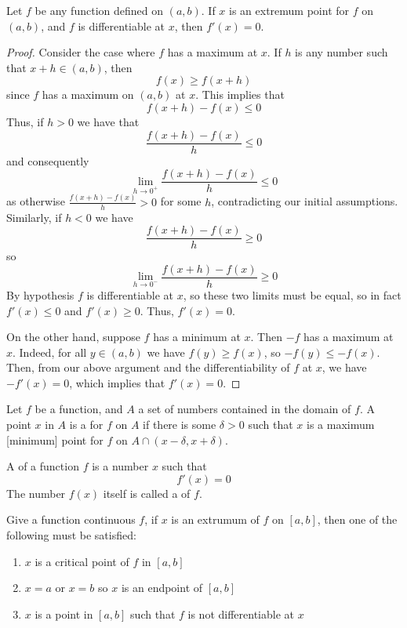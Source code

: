 \documentclass[12pt, a4paper, oneside, openright, titlepage]{book}
\begin{document}
\begin{thm}\label{thm:dirext}
    Let $f$ be any function defined on $(a,b)$. If $x$ is an extremum point for $f$ on $(a,b)$, and $f$ is differentiable at $x$, then $f'(x) = 0$.
\end{thm}
\begin{proof}
    Consider the case where $f$ has a maximum at $x$. If $h$ is any number such that $x+h \in (a,b)$, then $$f(x) \geq f(x+h)$$
    since $f$ has a maximum on $(a,b)$ at $x$. This implies that $$f(x+h)-f(x) \leq 0$$
    Thus, if $h > 0$ we have that $$\frac{f(x+h) - f(x)}{h} \leq 0$$
    and consequently $$\lim\limits_{h\rightarrow 0^+}\frac{f(x+h)-f(x)}{h} \leq 0$$
    as otherwise $\frac{f(x+h) - f(x)}{h} > 0$ for some $h$, contradicting our initial assumptions. Similarly, if $h < 0$ we have $$\frac{f(x+h)-f(x)}{h} \geq 0$$
    so $$\lim\limits_{h\rightarrow 0^-}\frac{f(x+h)-f(x)}{h} \geq 0$$
    By hypothesis $f$ is differentiable at $x$, so these two limits must be equal, so in fact $f'(x) \leq 0$ and $f'(x) \geq 0$. Thus, $f'(x) = 0$.

    On the other hand, suppose $f$ has a minimum at $x$. Then $-f$ has a maximum at $x$. Indeed, for all $y \in (a,b)$ we have $f(y) \geq f(x)$, so $-f(y) \leq -f(x)$. Then, from our above argument and the differentiability of $f$ at $x$, we have $-f'(x) = 0$, which implies that $f'(x) = 0$.
\end{proof}


\begin{defn}
    Let $f$ be a function, and $A$ a set of numbers contained in the domain of $f$. A point $x$ in $A$ is a  for $f$ on $A$ if there is some $\delta > 0$ such that $x$ is a maximum [minimum] point for $f$ on $A \cap(x-\delta,x+\delta)$.
\end{defn}


\begin{defn}
    A  of a function $f$ is a number $x$ such that \begin{equation}
        f'(x) = 0
    \end{equation}
    The number $f(x)$ itself is called a  of $f$.
\end{defn}

\begin{rmk}
    Give a function continuous $f$, if $x$ is an extrumum of $f$ on $[a,b]$, then one of the following must be satisfied: \begin{enumerate}
        \item $x$ is a critical point of $f$ in $[a,b]$
        \item $x = a$ or $x = b$ so $x$ is an endpoint of $[a,b]$
        \item $x$ is a point in $[a,b]$ such that $f$ is not differentiable at $x$
    \end{enumerate}
\end{rmk}
\end{document}
